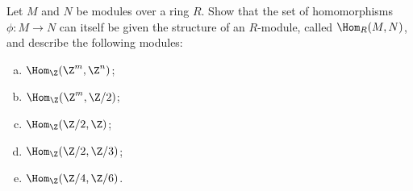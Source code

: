\begin{problem}
Let $M$ and $N$ be modules over a ring $R$. Show that the set of homomorphisms $\phi : M \to N$ can itself be given the structure of an $R$-module, called $\Hom_R(M,N)$, and describe the following modules:
\begin{enumerate}[(a)]
  \item $\Hom_\Z(\Z^m,\Z^n)$;
  \item $\Hom_\Z(\Z^m,\Z/2)$;
  \item $\Hom_\Z(\Z/2,\Z)$;
  \item $\Hom_\Z(\Z/2,\Z/3)$;
  \item $\Hom_\Z(\Z/4,\Z/6)$.
\end{enumerate}
\end{problem}